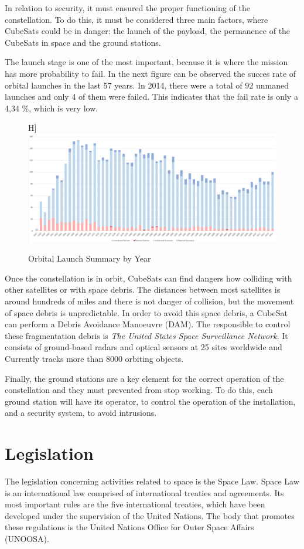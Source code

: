 In relation to security, it must ensured the proper functioning of the constellation. To do this, it must be considered three main factors, where CubeSats could be in danger: the launch of the payload, the permanence of the CubeSats in space and the ground stations.

The launch stage is one of the most important, because it is where the mission has more probability to fail. In the next figure can be observed the succes rate of orbital launches in the last 57 years. In 2014, there were a total of 92 unmaned launches and only 4 of them were failed. This indicates that the fail rate is only a 4,34 \%, which is very low. 

\begin{figure}H]
\includegraphics[scale=0.3]{./OrbitalSummary}
\centering
\caption{Orbital Launch Summary by Year}
\end{figure}

Once the constellation is in orbit, CubeSats can find dangers how colliding with other satellites or with space debris. The distances between most satellites is around hundreds of miles and there is not danger of collision, but the movement of space debris is unpredictable. In order to avoid this space debris, a CubeSat can perform a Debris Avoidance Manoeuvre (DAM). The responsible to control these fragmentation debris is \textit{The United States Space Surveillance Network}. It consists of ground-based radars and optical sensors at 25 sites worldwide and Currently tracks more than 8000 orbiting objects.

Finally, the ground stations are a key element for the correct operation of the constellation and they must prevented from stop working. To do this, each ground station will have its operator, to control the operation of the installation, and a security system, to avoid intrusions.

\section{Legislation}
The legislation concerning activities related to space is the Space Law. Space Law is an international law comprised of international treaties and agreements. Its most important rules are the five international treaties, which have been developed under the supervision of the United Nations. The body that promotes these regulations is the United Nations Office for Outer Space Affairs (UNOOSA).

